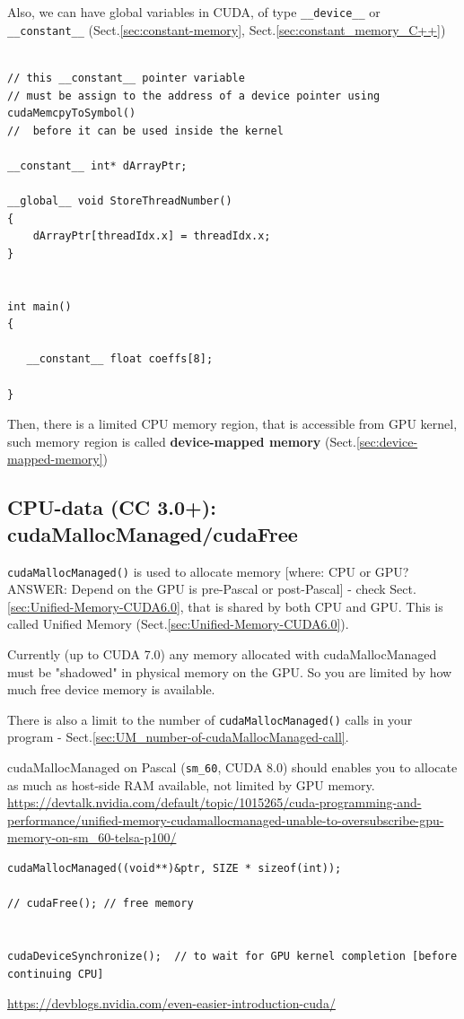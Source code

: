 Also,  we can have global variables in CUDA, of type \verb!__device__! or
\verb!__constant__! (Sect.\ref{sec:constant-memory},
Sect.\ref{sec:constant_memory_C++})

\begin{verbatim}

// this __constant__ pointer variable 
// must be assign to the address of a device pointer using cudaMemcpyToSymbol()
//  before it can be used inside the kernel

__constant__ int* dArrayPtr;

__global__ void StoreThreadNumber()
{
    dArrayPtr[threadIdx.x] = threadIdx.x;
}


int main()
{

   __constant__ float coeffs[8];
   
}
\end{verbatim}
 

Then, there is a limited CPU memory region, that is accessible from GPU kernel,
such memory region is called {\bf device-mapped memory}
(Sect.\ref{sec:device-mapped-memory})


\subsection{CPU-data (CC 3.0+): cudaMallocManaged/cudaFree}
\label{sec:cudaMallocManaged}

\verb!cudaMallocManaged()! is used to allocate memory [where: CPU or GPU?
ANSWER: Depend on the GPU is pre-Pascal or post-Pascal] - check
Sect.\ref{sec:Unified-Memory-CUDA6.0}, that is shared by both CPU and GPU.
This is called Unified Memory (Sect.\ref{sec:Unified-Memory-CUDA6.0}).

Currently (up to CUDA 7.0) any memory allocated with cudaMallocManaged must be
"shadowed" in physical memory on the GPU. So you are limited by how much free
device memory is available.

There is also a limit to the number of \verb!cudaMallocManaged()! calls in your
program - Sect.\ref{sec:UM_number-of-cudaMallocManaged-call}.

cudaMallocManaged on Pascal (\verb!sm_60!, CUDA 8.0) should enables you to
allocate as much as host-side RAM available, not limited by GPU memory.
\url{https://devtalk.nvidia.com/default/topic/1015265/cuda-programming-and-performance/unified-memory-cudamallocmanaged-unable-to-oversubscribe-gpu-memory-on-sm_60-telsa-p100/}

\begin{verbatim}
cudaMallocManaged((void**)&ptr, SIZE * sizeof(int));

// cudaFree(); // free memory


cudaDeviceSynchronize();  // to wait for GPU kernel completion [before continuing CPU]
\end{verbatim}
\url{https://devblogs.nvidia.com/even-easier-introduction-cuda/}

